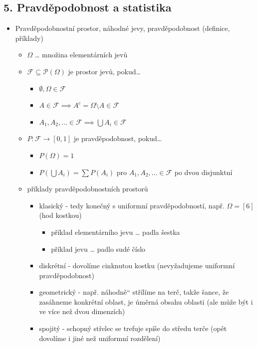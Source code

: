 \subsection{5. Pravděpodobnost a statistika}
\begin{itemize}
\item Pravděpodobnostní prostor, náhodné jevy, pravděpodobnost (definice, příklady)
\begin{itemize}
\item $\Omega$ \dots{} množina elementárních jevů
\item $\mathcal F\subseteq\mathcal P(\Omega)$ je prostor jevů, pokud\dots{}
\begin{itemize}
\item $\emptyset,\Omega\in\mathcal F$
\item $A\in\mathcal F\implies A^c=\Omega\setminus A\in\mathcal F$
\item $A_1,A_2,\ldots\in\mathcal F\implies\bigcup A_i\in \mathcal F$
\end{itemize}
\item $P:\mathcal F\to[0,1]$ je pravděpodobnost, pokud\dots{}
\begin{itemize}
\item $P(\Omega)=1$
\item $P(\bigcup A_i)=\sum P(A_i)$ pro $A_1,A_2,\ldots\in \mathcal F$ po dvou disjunktní
\end{itemize}
\item příklady pravděpodobnostních prostorů
\begin{itemize}
\item klasický - tedy konečný s uniformní pravděpodobností, např. $\Omega=[6]$ (hod kostkou)
\begin{itemize}
\item příklad elementárního jevu \dots{} padla šestka
\item příklad jevu \dots{} padlo sudé číslo
\end{itemize}
\item diskrétní - dovolíme cinknutou kostku (nevyžadujeme uniformní pravděpodobnost)
\item geometrický - např. \quotedblbase{}náhodně\textquotedblleft{} střílíme na terč, takže šance, že zasáhneme konkrétní oblast, je úměrná obsahu oblasti (ale může být i ve více než dvou dimenzích)
\item spojitý - schopný střelec se trefuje spíše do středu terče (opět dovolíme i jiné než uniformní rozdělení)
\end{itemize}
\end{itemize}

\end{itemize}
